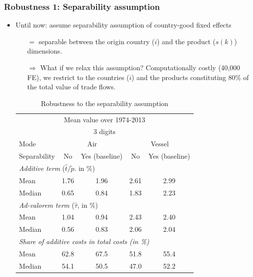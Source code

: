 \documentclass[10 pt,Helvetica, french]{beamer}
\begin{document}

\begin{frame}[label = robustness1]
\frametitle{Robustness 1: Separability assumption}
\begin{itemize}
\item Until now: assume separability assumption of country-good fixed effects
\begin{itemize}
\item[$=$]separable between the origin country ($i$) and the product ($s(k)$) dimensions.\vspace{0.1cm}
\pause
\item[$\Rightarrow$] What if we relax this assumption? Computationally costly (40,000 FE), we restrict to the countries ($i$) and the products constituting 80\% of the total value of trade flows.
 \end{itemize}
 \pause
\begin{table}[htbp]
  \centering
   \scriptsize{
  \caption{Robustness to the separability assumption}
\begin{center}
    \begin{tabular}{lcc|cc}
    \hline \hline
\multicolumn{5}{c}{Mean value over 1974-2013} \\
 \multicolumn{5}{c}{3 digits} \\    \hline \hline
   Mode  & \multicolumn{2}{c|}{Air} & \multicolumn{2}{c}{Vessel} \\ \hline
   Separability & No  & Yes (baseline) & No & Yes (baseline)\\ \hline
    \multicolumn{5}{l}{\textit{Additive term} ($\widehat{t}/\widetilde{p}$.
in \%)}  \\
    Mean  & 1.76 & 1.96 & 2.61 & 2.99 \\
    Median &0.65 & 0.84 &1.83 & 2.23 \\ \hline
    \multicolumn{5}{l}{\textit{Ad-valorem term} ($\widehat{\tau}$, in \%)}\\
    Mean  & 1.04 & 0.94 & 2.43 & 2.40 \\
    Median & 0.56 & 0.83 & 2.06 & 2.04 \\ \hline
\multicolumn{5}{l}{\textit{Share of additive costs in total costs (in \%)}} \\
    Mean  & 62.8  & 67.5  & 51.8  & 55.4 \\
    Median & 54.1  & 50.5  & 47.0  & 52.2 \\  \hline

\end{tabular}
\end{center}}
\end{table}
\end{itemize}
\end{frame}
\end{document}
